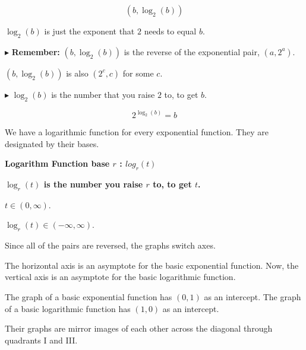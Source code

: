 \documentclass{ximera}
\begin{document}
\[
(b, \log_2(b))
\]




$\log_2(b)$ is just the exponent that $2$ needs to equal $b$.





$\blacktriangleright$ \textbf{Remember:} $(b, \log_2(b))$ is the reverse of the exponential pair, $(a, 2^a)$.  

$(b, \log_2(b))$ is also $(2^c, c)$ for some $c$. 


$\blacktriangleright$  $\log_2(b)$ is the number that you raise $2$ to, to get $b$.  

\[   2^{\log_2(b)} = b     \]

We have a logarithmic function for every exponential function.  They are designated by their bases.
















\begin{idea} \textbf{\textcolor{blue!55!black}{Logarithm Function base $r$ : $log_r(t)$}}



\begin{center}
\textbf{\textcolor{red!75!green}{$\log_r(t)$ is the number you raise $r$ to, to get $t$.}} 
\end{center}



$t \in (0, \infty)$. 

$\log_r(t) \in (-\infty, \infty)$.


\end{idea}






Since all of the pairs are reversed, the graphs switch axes.



The horizontal axis is an asymptote for the basic exponential function. Now, the vertical axis is an asymptote for the basic logarithmic function.


The graph of a basic exponential function has $(0,1)$ as an intercept.  The graph of a basic logarithmic function has $(1,0)$ as an intercept. 


Their graphs are mirror images of each other across the diagonal through quadrants I and III.
\end{document}
